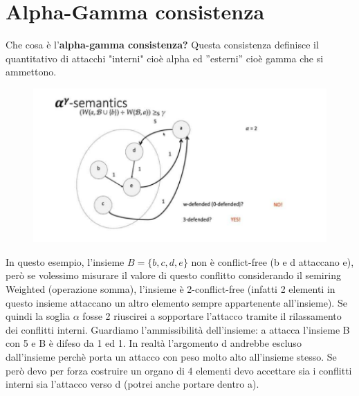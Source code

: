 \section{Alpha-Gamma consistenza}
Che cosa è l’\textbf{alpha-gamma consistenza?} Questa consistenza definisce il quantitativo di attacchi "interni" cioè alpha ed ”esterni” cioè gamma che si ammettono.
\begin{figure}[htp]
	\centering
    \includegraphics[width=12cm, keepaspectratio]{img/Cap6/cons.png}
\end{figure}
In questo esempio, l’insieme $B = \{b, c, d, e\}$ non è conflict-free (b e d attaccano e), però se volessimo misurare il valore di questo conflitto considerando il semiring Weighted (operazione somma), l’insieme è 2-conflict-free (infatti 2 elementi in questo insieme attaccano un altro elemento sempre appartenente all’insieme). Se quindi la soglia $\alpha$ fosse 2 riuscirei a sopportare l’attacco
tramite il rilassamento dei conflitti interni. Guardiamo l’ammissibilità dell’insieme: a attacca l’insieme B con 5 e B è difeso da 1 ed 1. In realtà l’argomento d andrebbe escluso dall’insieme
perchè porta un attacco con peso molto alto all’insieme stesso. Se però devo per forza costruire un organo di 4 elementi devo accettare sia i conflitti interni sia l’attacco verso d (potrei anche portare dentro a).
